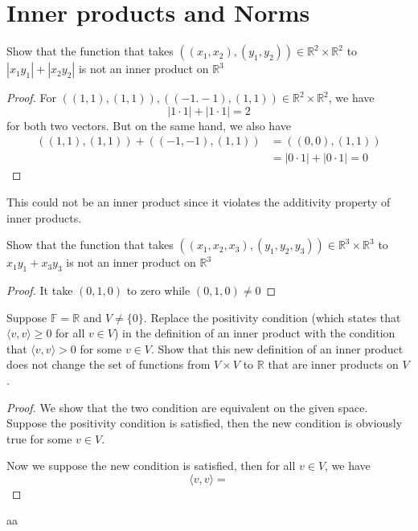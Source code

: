 \section{Inner products and Norms}
\begin{exercise}
Show that the function that takes $((x_1,x_2),(y_1,y_2)) \in \mathbb{R}^2 \times \mathbb{R}^2$
to $\left\vert x_1y_1 \right\vert + \left\vert x_2y_2 \right\vert$ is not an inner product on $\mathbb{R}^3$
\end{exercise}
\begin{proof}
	For $((1,1), (1,1)), ((-1.-1), (1,1)) \in \mathbb{R}^2 \times \mathbb{R}^2$, we have \[
		\left\vert 1 \cdot 1 \right\vert + \left\vert 1 \cdot 1 \right\vert = 2 \]
	for both two vectors. But on the same hand, we also have
	\begin{align*}
		((1,1),(1,1)) + ((-1,-1),(1,1)) & = ((0,0),(1,1))                                                           \\
		                                & = \left\vert 0 \cdot 1 \right\vert + \left\vert 0 \cdot 1 \right\vert = 0
	\end{align*}
\end{proof}
This could not be an inner product since it violates
the additivity property of inner products.

\begin{exercise}
Show that the function that takes $((x_1,x_2,x_3),(y_1,y_2,y_3)) \in \mathbb{R}^{3} \times \mathbb{R}^3$
to $x_1y_1 + x_3y_3$ is not an inner product on $\mathbb{R}^3$
\end{exercise}
\begin{proof}
	It take $(0,1,0)$ to zero while $(0,1,0) \neq 0$
\end{proof}

\begin{exercise}
Suppose $\mathbb{F} = \mathbb{R}$ and $V \neq \{0\}$. Replace the positivity condition
(which states that $\langle v, v \rangle \geq 0$ for all $v \in V$) in the definition
of an inner product with the condition that $\langle v, v \rangle > 0$
for some $v \in V$. Show that this new definition of an inner product
does not change the set of functions from $V \times V$ to $\mathbb{R}$
that are inner products on $V$.
\end{exercise}
\begin{proof}
	We show that the two condition are equivalent on the given space.
	Suppose the positivity condition is satisfied, then the new condition
	is obviously true for some $v \in V$. \par
	Now we suppose the new condition is satisfied, then for all $v \in V$, we have \[
		\langle v, v \rangle = \]
\end{proof}
\begin{exercise}
aa
\end{exercise}
